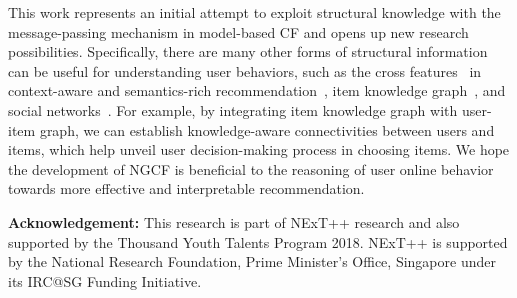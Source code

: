 \documentclass[sigconf]{acmart}
\theoremstyle{definition}
\begin{document}
This work represents an initial attempt to exploit structural knowledge with the message-passing mechanism in model-based CF and opens up new research possibilities.
Specifically, there are many other forms of structural information can be useful for understanding user behaviors, such as the cross features~\cite{FashionInterpretable} in context-aware and semantics-rich recommendation~\cite{DBLP:conf/mm/LiuWZSXYL17,SongFHYLN18}, item knowledge graph~\cite{KGAT}, and social networks~\cite{ItemSilk}.
For example, by integrating item knowledge graph with user-item graph, we can establish knowledge-aware connectivities between users and items, which help unveil user decision-making process in choosing items.
We hope the development of NGCF is beneficial to the reasoning of user online behavior towards more effective and interpretable recommendation.


\vspace{5px}
\noindent\textbf{Acknowledgement:}
This research is part of NExT++ research and also supported by the Thousand Youth Talents Program 2018.
NExT++ is supported by the National Research Foundation, Prime Minister's Office, Singapore under its IRC@SG Funding Initiative.




%
 


\balance


\balance
\end{document}
